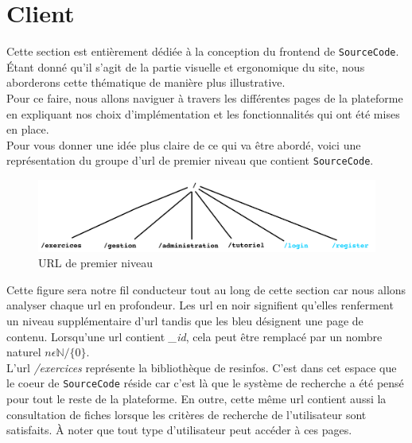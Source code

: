 \section{Client}

Cette section est entièrement dédiée à la conception du \gls{frontend} de \texttt{SourceCode}. Étant donné qu'il s'agit de la partie visuelle et ergonomique du site, nous aborderons cette thématique de manière plus illustrative.\\

Pour ce faire, nous allons naviguer à travers les différentes pages de la plateforme en expliquant nos choix d'implémentation et les fonctionnalités qui ont été mises en place.\\

Pour vous donner une idée plus claire de ce qui va être abordé, voici une représentation du groupe d'url de premier niveau que contient \texttt{SourceCode}.\\

\begin{figure}[H]
    \includegraphics[width=\textwidth,height=0.35\textheight,keepaspectratio]{images/client/overview_client.jpeg}
    \centering
    \caption[SourceCode : Représentation des URL de premier niveau]{URL de premier niveau}
\end{figure}

Cette figure sera notre fil conducteur tout au long de cette section car nous allons analyser chaque url en profondeur. 
Les url en noir signifient qu'elles renferment un niveau supplémentaire d'url tandis que les bleu désignent une page de contenu. Lorsqu'une url contient \textit{\_id}, cela peut être remplacé par un nombre naturel $ n  \epsilon  \mathbb{N} / \{0\}$.\\

L'url \textit{/exercices} représente la bibliothèque de \glspl{resinfo}. C'est dans cet espace que le coeur de \texttt{SourceCode} réside car c'est là que le système de recherche a été pensé pour tout le reste de la plateforme. En outre,
cette même url contient aussi la consultation de \glspl{fiche} lorsque les critères de recherche de l'utilisateur sont satisfaits. À noter que tout type d'utilisateur peut accéder à ces pages.\\

